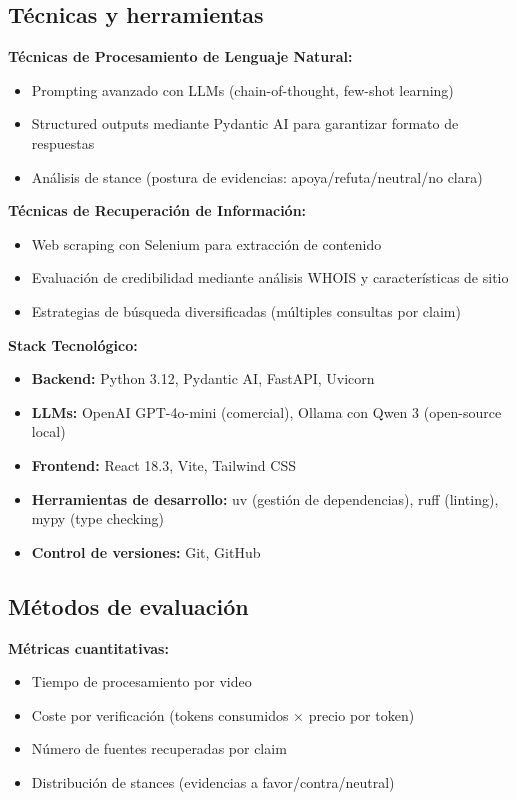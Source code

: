\documentclass[12pt,a4paper]{article}
\begin{document}
\subsection{Técnicas y herramientas}

\textbf{Técnicas de Procesamiento de Lenguaje Natural:}
\begin{itemize}
    \item Prompting avanzado con LLMs (chain-of-thought, few-shot learning)
    \item Structured outputs mediante Pydantic AI para garantizar formato de respuestas
    \item Análisis de stance (postura de evidencias: apoya/refuta/neutral/no clara)
\end{itemize}

\textbf{Técnicas de Recuperación de Información:}
\begin{itemize}
    \item Web scraping con Selenium para extracción de contenido
    \item Evaluación de credibilidad mediante análisis WHOIS y características de sitio
    \item Estrategias de búsqueda diversificadas (múltiples consultas por claim)
\end{itemize}

\textbf{Stack Tecnológico:}
\begin{itemize}
    \item \textbf{Backend:} Python 3.12, Pydantic AI, FastAPI, Uvicorn
    \item \textbf{LLMs:} OpenAI GPT-4o-mini (comercial), Ollama con Qwen 3 (open-source local)
    \item \textbf{Frontend:} React 18.3, Vite, Tailwind CSS
    \item \textbf{Herramientas de desarrollo:} uv (gestión de dependencias), ruff (linting), mypy (type checking)
    \item \textbf{Control de versiones:} Git, GitHub
\end{itemize}

\subsection{Métodos de evaluación}

\textbf{Métricas cuantitativas:}
\begin{itemize}
    \item Tiempo de procesamiento por video
    \item Coste por verificación (tokens consumidos × precio por token)
    \item Número de fuentes recuperadas por claim
    \item Distribución de stances (evidencias a favor/contra/neutral)
\end{itemize}
\end{document}
